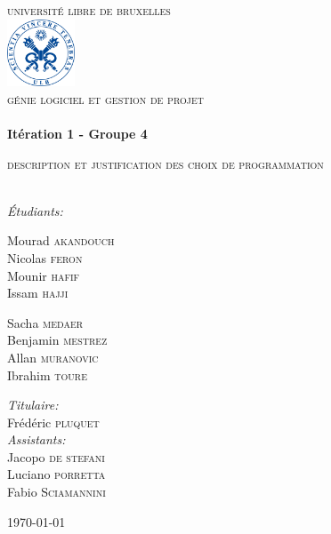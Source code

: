 \begin{titlepage}
\begin{center}


\textsc{\LARGE universit\'e libre de bruxelles}\\[1.5cm]

\includegraphics[width=0.15\textwidth]{ulblogo.jpg}~\\[1cm]

\textsc{\Large génie logiciel et gestion de projet}\\[0.3cm] 

\HRule \\[0.4cm]
{ \huge \bfseries Itération 1 - Groupe 4 \\[0.4cm] }

\textsc{\Large description et justification des choix de programmation}\\[0.4cm]

\HRule \\[1.5cm]

\noindent
\begin{center} \Large
\emph{Étudiants:}\\
\end{center}
\begin{minipage}{0.4\textwidth}
\begin{flushleft} \large
Mourad \textsc{akandouch}\\
Nicolas \textsc{feron}\\
Mounir \textsc{hafif}\\
Issam \textsc{hajji}
\end{flushleft}
\end{minipage}
\begin{minipage}{0.4\textwidth}
\begin{flushright} \large
Sacha \textsc{medaer}\\
Benjamin \textsc{mestrez}\\
Allan \textsc{muranovic}\\
Ibrahim \textsc{toure}
\end{flushright}
\end{minipage}
\linebreak
\linebreak
\begin{center} \large
\emph{Titulaire:} \\
Frédéric \textsc{pluquet}\\
\emph{Assistants:} \\
Jacopo \textsc{de stefani}\\
Luciano \textsc{porretta}\\
Fabio \textsc{Sciamannini}
\end{center}



\vfill

{\large \today}

\end{center}
\end{titlepage}